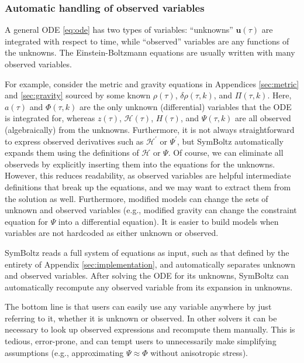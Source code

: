 \documentclass{aa}
\newcommand\scrH{\mathscr{H}}
\begin{document}
\subsubsection{Automatic handling of observed variables}
\label{sec:observed}

A general ODE \eqref{eq:ode} has two types of variables: \enquote{unknowns} $\boldsymbol{u}(\tau)$ are integrated with respect to time, while \enquote{observed} variables are any functions of the unknowns.
The Einstein-Boltzmann equations are usually written with many observed variables.

For example, consider the metric and gravity equations in Appendices \ref{sec:metric} and \ref{sec:gravity} sourced by some known $\rho(\tau)$, $\delta\rho(\tau,k)$, and $\Pi(\tau,k)$.
Here, $a(\tau)$ and $\Phi(\tau,k)$ are the only unknown (differential) variables that the ODE is integrated for,
whereas $z(\tau)$, $\scrH(\tau)$, $H(\tau)$, and $\Psi(\tau,k)$ are all observed (algebraically) from the unknowns.
Furthermore, it is not always straightforward to express observed derivatives such as $\scrH^\prime$ or $\Psi^\prime$, but SymBoltz automatically expands them using the definitions of $\scrH$ or $\Psi$.
Of course, we can eliminate all observeds by explicitly inserting them into the equations for the unknowns.
However, this reduces readability, as observed variables are helpful intermediate definitions that break up the equations, and we may want to extract them from the solution as well.
Furthermore, modified models can change the sets of unknown and observed variables (e.g., modified gravity can change the constraint equation for $\Psi$ into a differential equation).
It is easier to build models when variables are not hardcoded as either unknown or observed.

SymBoltz reads a full system of equations as input, such as that defined by the entirety of Appendix \ref{sec:implementation}, and automatically separates unknown and observed variables.
After solving the ODE for its unknowns, SymBoltz can automatically recompute any observed variable from its expansion in unknowns.

The bottom line is that users can easily use any variable anywhere by just referring to it, whether it is unknown or observed.
In other solvers it can be necessary to look up observed expressions and recompute them manually.
This is tedious, error-prone, and can tempt users to unnecessarily make simplifying assumptions (e.g., approximating $\Psi \approx \Phi$ without anisotropic stress).
\end{document}
